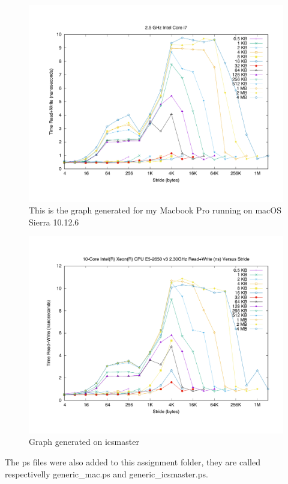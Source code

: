 \documentclass[unicode,11pt,a4paper,oneside,numbers=endperiod,openany]{scrartcl}
\begin{document}
\begin{enumerate}
        \begin{figure}[H]
            \includegraphics[width=\linewidth]{./membench/generic_mac.pdf}
            \caption{This is the graph generated for my Macbook Pro running on macOS Sierra 10.12.6}
        \end{figure}
        \begin{figure}[H]
            \includegraphics[width=\linewidth]{./membench/generic_icsmaster.pdf}
            \caption{Graph generated on icsmaster}
        \end{figure}
           
        The ps files were also added to this assignment folder, they are called respectivelly generic\_mac.ps and generic\_icsmaster.ps.



\end{enumerate}
\end{document}

